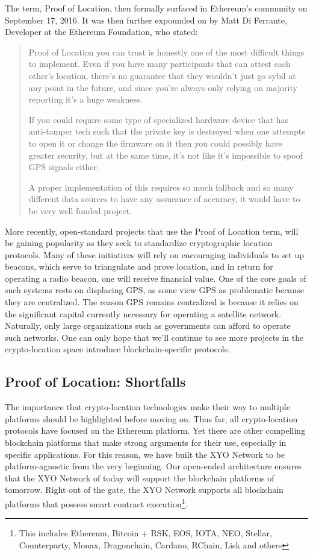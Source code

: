 \documentclass{article}
\begin{document}
The term, Proof of Location, then formally surfaced in Ethereum's community on September 17, 2016. It was then further expounded on by Matt Di Ferrante, Developer at the Ethereum Foundation, who stated:

\begin{quotation}
Proof of Location you can trust is honestly one of the most difficult things to implement. Even if you have many participants that can attest each other's location, there's no guarantee that they wouldn't just go sybil at any point in the future, and since you're always only relying on majority reporting it's a huge weakness.

If you could require some type of specialized hardware device that has anti-tamper tech such that the private key is destroyed when one attempts to open it or change the firmware on it then you could possibly have greater security, but at the same time, it's not like it's impossible to spoof GPS signals either.

A proper implementation of this requires so much fallback and so many different data sources to have any assurance of accuracy, it would have to be very well funded project.
\end{quotation}

More recently, open-standard projects that use the Proof of Location term, will be gaining popularity as they seek to standardize cryptographic location protocols. Many of these initiatives will rely on encouraging individuals to set up beacons, which serve to triangulate and prove location, and in return for operating a radio beacon, one will receive financial value. One of the core goals of such systems rests on displacing GPS, as some view GPS as problematic because they are centralized. The reason GPS remains centralized is because it relies on the significant capital currently necessary for operating a satellite network. Naturally, only large organizations such as governments can afford to operate such networks. One can only hope that we'll continue to see more projects in the crypto-location space introduce blockchain-specific protocols.


\subsection {Proof of Location: Shortfalls}
The importance that crypto-location technologies make their way to multiple platforms should be highlighted before moving on. Thus far, all crypto-location protocols have focused on the Ethereum platform. Yet there are other compelling blockchain platforms that make strong arguments for their use, especially in specific applications. For this reason, we have built the XYO Network to be platform-agnostic from the very beginning. Our open-ended architecture ensures that the XYO Network of today will support the blockchain platforms of tomorrow. Right out of the gate, the XYO Network supports all blockchain platforms that possess smart contract execution\footnote{This includes Ethereum, Bitcoin + RSK, EOS, IOTA, NEO, Stellar, Counterparty, Monax, Dragonchain, Cardano, RChain, Lisk and others}.
\end{document}
